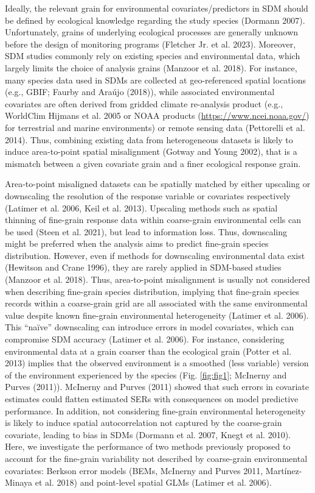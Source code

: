 \documentclass[
  12pt,
  a4paper]{article}
\begin{document}
Ideally, the relevant grain for environmental covariates/predictors in SDM should be defined by ecological knowledge regarding the study species (Dormann 2007). Unfortunately, grains of underlying ecological processes are generally unknown before the design of monitoring programs (Fletcher Jr. et al. 2023). Moreover, SDM studies commonly rely on existing species and environmental data, which largely limits the choice of analysis grains (Manzoor et al. 2018). For instance, many species data used in SDMs are collected at geo-referenced spatial locations (e.g., GBIF; Faurby and Araújo (2018)), while associated environmental covariates are often derived from gridded climate re-analysis product (e.g., WorldClim Hijmans et al. 2005 or NOAA products (\url{https://www.ncei.noaa.gov/}) for terrestrial and marine environments) or remote sensing data (Pettorelli et al. 2014). Thus, combining existing data from heterogeneous datasets is likely to induce area-to-point spatial misalignment (Gotway and Young 2002), that is a mismatch between a given covariate grain and a finer ecological response grain.

Area-to-point misaligned datasets can be spatially matched by either upscaling or downscaling the resolution of the response variable or covariates respectively (Latimer et al. 2006, Keil et al. 2013). Upscaling methods such as spatial thinning of fine-grain response data within coarse-grain environmental cells can be used (Steen et al. 2021), but lead to information loss. Thus, downscaling might be preferred when the analysis aims to predict fine-grain species distribution. However, even if methods for downscaling environmental data exist (Hewitson and Crane 1996), they are rarely applied in SDM-based studies (Manzoor et al. 2018). Thus, area-to-point misalignment is usually not considered when describing fine-grain species distribution, implying that fine-grain species records within a coarse-grain grid are all associated with the same environmental value despite known fine-grain environmental heterogeneity (Latimer et al. 2006). This ``naïve'' downscaling can introduce errors in model covariates, which can compromise SDM accuracy (Latimer et al. 2006). For instance, considering environmental data at a grain coarser than the ecological grain (Potter et al. 2013) implies that the observed environment is a smoothed (less variable) version of the environment experienced by the species (Fig. \ref{fig:fig1}; McInerny and Purves (2011)). McInerny and Purves (2011) showed that such errors in covariate estimates could flatten estimated SERs with consequences on model predictive performance. In addition, not considering fine-grain environmental heterogeneity is likely to induce spatial autocorrelation not captured by the coarse-grain covariate, leading to bias in SDMs (Dormann et al. 2007, Knegt et al. 2010). Here, we investigate the performance of two methods previously proposed to account for the fine-grain variability not described by coarse-grain environmental covariates: Berkson error models (BEMs, McInerny and Purves 2011, Martínez-Minaya et al. 2018) and point-level spatial GLMs (Latimer et al. 2006).
\end{document}

